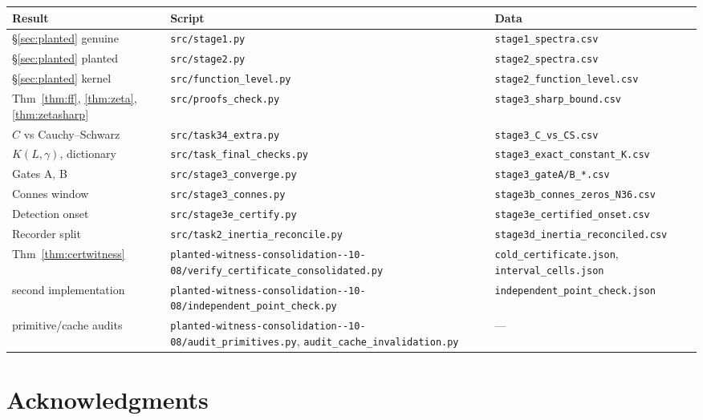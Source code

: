 \documentclass[11pt,a4paper]{article}
\theoremstyle{definition}
\theoremstyle{remark}
\newcommand{\src}[1]{{\footnotesize\texttt{#1}}}
\begin{document}
\begin{center}
\begin{tabular}{@{}lll@{}}
\toprule
Result & Script & Data \\
\midrule
\S\ref{sec:planted} genuine & \src{src/stage1.py} & \src{stage1\_spectra.csv} \\
\S\ref{sec:planted} planted & \src{src/stage2.py} & \src{stage2\_spectra.csv} \\
\S\ref{sec:planted} kernel & \src{src/function\_level.py} & \src{stage2\_function\_level.csv} \\
Thm~\ref{thm:ff}, \ref{thm:zeta}, \ref{thm:zetasharp} & \src{src/proofs\_check.py} & \src{stage3\_sharp\_bound.csv} \\
$C$ vs Cauchy--Schwarz & \src{src/task34\_extra.py} & \src{stage3\_C\_vs\_CS.csv} \\
$K(L,\gamma)$, dictionary & \src{src/task\_final\_checks.py} & \src{stage3\_exact\_constant\_K.csv} \\
Gates A, B & \src{src/stage3\_converge.py} & \src{stage3\_gateA/B\_*.csv} \\
Connes window & \src{src/stage3\_connes.py} & \src{stage3b\_connes\_zeros\_N36.csv} \\
Detection onset & \src{src/stage3e\_certify.py} & \src{stage3e\_certified\_onset.csv} \\
Recorder split & \src{src/task2\_inertia\_reconcile.py} & \src{stage3d\_inertia\_reconciled.csv} \\
Thm~\ref{thm:certwitness} & \src{planted-\allowbreak witness-\allowbreak consolidation-\allowbreak 2026-10-08/\allowbreak verify\_certificate\_consolidated.py} & \src{cold\_certificate.json}, \src{interval\_cells.json} \\
\quad second implementation & \src{planted-\allowbreak witness-\allowbreak consolidation-\allowbreak 2026-10-08/\allowbreak independent\_point\_check.py} & \src{independent\_point\_check.json} \\
\quad primitive/cache audits & \src{planted-\allowbreak witness-\allowbreak consolidation-\allowbreak 2026-10-08/\allowbreak audit\_primitives.py}, \src{audit\_cache\_invalidation.py} & --- \\
\bottomrule
\end{tabular}
\end{center}

\section*{Acknowledgments}
\end{document}
